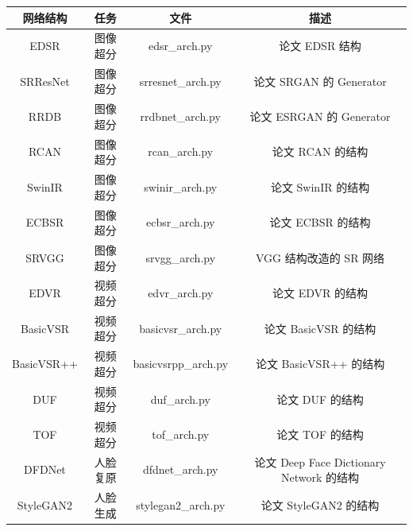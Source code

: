 \documentclass[../main.tex]{subfiles}
\begin{document}
\begin{table}[h]
    \centering
    {
        \begin{tabular}{|c|c|c|c|}
            \hline
            \textbf{网络结构} & \textbf{任务} & \textbf{文件}          & \textbf{描述}                          \\ \hline
            EDSR              & 图像超分      & edsr\_arch.py          & 论文 EDSR 结构                           \\ \hline
            SRResNet          & 图像超分      & srresnet\_arch.py      & 论文 SRGAN 的 Generator                   \\ \hline
            RRDB              & 图像超分      & rrdbnet\_arch.py       & 论文 ESRGAN 的 Generator                  \\ \hline
            RCAN              & 图像超分      & rcan\_arch.py          & 论文 RCAN 的结构                         \\ \hline
            SwinIR            & 图像超分      & swinir\_arch.py        & 论文 SwinIR 的结构                       \\ \hline
            ECBSR             & 图像超分      & ecbsr\_arch.py         & 论文 ECBSR 的结构                        \\ \hline
            SRVGG             & 图像超分      & srvgg\_arch.py         & VGG 结构改造的 SR 网络                    \\ \hline
            EDVR              & 视频超分      & edvr\_arch.py          & 论文 EDVR 的结构                         \\ \hline
            BasicVSR          & 视频超分      & basicvsr\_arch.py      & 论文 BasicVSR 的结构                     \\ \hline
            BasicVSR++        & 视频超分      & basicvsrpp\_arch.py    & 论文 BasicVSR++ 的结构                   \\ \hline
            DUF               & 视频超分      & duf\_arch.py           & 论文 DUF 的结构                          \\ \hline
            TOF               & 视频超分      & tof\_arch.py           & 论文 TOF 的结构                          \\ \hline
            DFDNet            & 人脸复原      & dfdnet\_arch.py        & 论文 Deep Face Dictionary Network 的结构 \\ \hline
            StyleGAN2         & 人脸生成      & stylegan2\_arch.py     & 论文 StyleGAN2 的结构                    \\ \hline

\end{tabular}}
\end{table}
\end{document}
